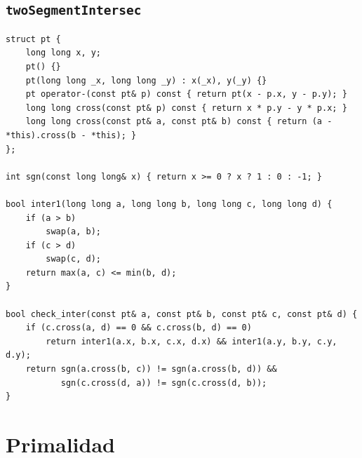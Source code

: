 \subsection{\texttt{twoSegmentIntersec}}
\begin{lstlisting}
struct pt {
    long long x, y;
    pt() {}
    pt(long long _x, long long _y) : x(_x), y(_y) {}
    pt operator-(const pt& p) const { return pt(x - p.x, y - p.y); }
    long long cross(const pt& p) const { return x * p.y - y * p.x; }
    long long cross(const pt& a, const pt& b) const { return (a - *this).cross(b - *this); }
};

int sgn(const long long& x) { return x >= 0 ? x ? 1 : 0 : -1; }

bool inter1(long long a, long long b, long long c, long long d) {
    if (a > b)
        swap(a, b);
    if (c > d)
        swap(c, d);
    return max(a, c) <= min(b, d);
}

bool check_inter(const pt& a, const pt& b, const pt& c, const pt& d) {
    if (c.cross(a, d) == 0 && c.cross(b, d) == 0)
        return inter1(a.x, b.x, c.x, d.x) && inter1(a.y, b.y, c.y, d.y);
    return sgn(a.cross(b, c)) != sgn(a.cross(b, d)) &&
           sgn(c.cross(d, a)) != sgn(c.cross(d, b));
}\end{lstlisting}

\section{Primalidad}

